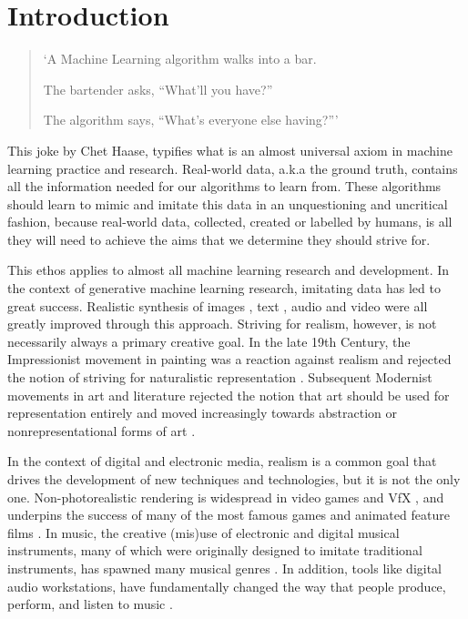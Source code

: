 \chapter{Introduction}
\label{ch:intro}

\begin{quote}

`A Machine Learning algorithm walks into a bar.

The bartender asks, ``What'll you have?''

The algorithm says, ``What's everyone else having?'''\citep{haase2017bar} \end{quote}

This joke by Chet Haase, typifies what is an almost universal axiom in machine learning practice and research. 
Real-world data, a.k.a the ground truth, contains all the information needed for our algorithms to learn from. 
These algorithms should learn to mimic and imitate this data in an unquestioning and uncritical fashion, because real-world data, collected, created or labelled by humans, is all they will need to achieve the aims that we determine they should strive for.

This ethos applies to almost all machine learning research and development. In the context of generative machine learning research, imitating data has led to great success. 
Realistic synthesis of images \citep{karras2019style}, text \citep{radford2018improving}, audio \citep{oord2016wavenet} and video \citep{openai2024sora} were all greatly improved through this approach. 
Striving for realism, however, is not necessarily always a primary creative goal.
In the late 19th Century, the Impressionist movement in painting was a reaction against realism and rejected the notion of striving for naturalistic representation \citep{venturi1941aesthetic}. 
Subsequent Modernist movements in art and literature rejected the notion that art should be used for representation entirely and moved increasingly towards abstraction or nonrepresentational forms of art \citep{lewis2007cambridge}.

In the context of digital and electronic media, realism is a common goal that drives the development of new techniques and technologies, but it is not the only one. 
Non-photorealistic rendering is widespread in video games and VfX \citep{strothotte2002non}, and underpins the success of many of the most famous games and animated feature films \citep{kyprianidis2012state}. 
In music, the creative (mis)use of electronic and digital musical instruments, many of which were originally designed to imitate traditional instruments, has spawned many musical genres \citep{mcglynn2017happy}. 
In addition, tools like digital audio workstations, have fundamentally changed the way that people produce, perform, and listen to music \citep{ashbourn2021use}.

